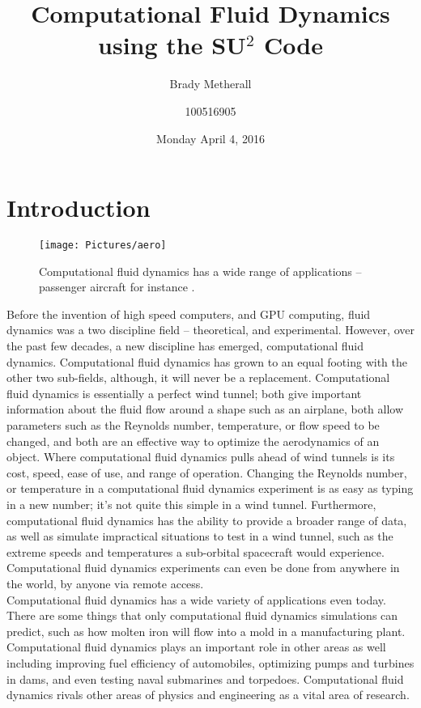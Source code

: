 \documentclass[10pt, titlepage]{article}
\title{Computational Fluid Dynamics \\ \large using the SU$^2$ Code}
\author{Brady Metherall \and 100516905}
\date{Monday April 4, 2016}
\makeatletter
\let\tohe@listfig\relax
\let\tohe@listtab\relax
\let\tohe@listoffigtab\listoffigtab
\def\listoffigtab{%
  \begingroup
  \def\tohe@listfig{Fig.~}
  \def\tohe@listtab{Tab.~}
  \tohe@listoffigtab
  \endgroup  
}
\makeatother
\begin{document}
\maketitle
\setlength\parindent{0pt}
\lstset{language=myMMA}

\listoffigtab

\section{Introduction}

\begin{wrapfigure}{R}{0.45\textwidth}
\centering
\texttt{[image: Pictures/aero]}
\caption[Example of Computational Fluid Dynamics Applications]{Computational fluid dynamics has a wide range of applications -- passenger aircraft for instance \cite{aeroplane}.}
\label{fig:aeroplane}
\end{wrapfigure}

Before the invention of high speed computers, and GPU computing, fluid dynamics was a two discipline field -- theoretical, and experimental. However, over the past few decades, a new discipline has emerged, computational fluid dynamics. Computational fluid dynamics has grown to an equal footing with the other two sub-fields, although, it will never be a replacement.  Computational fluid dynamics is essentially a perfect wind tunnel; both give important information about the fluid flow around a shape such as an airplane, both allow parameters such as the Reynolds number, temperature, or flow speed to be changed, and both are an effective way to optimize the aerodynamics of an object. Where computational fluid dynamics pulls ahead of wind tunnels is its cost, speed, ease of use, and range of operation. Changing the Reynolds number, or temperature in a computational fluid dynamics experiment is as easy as typing in a new number; it's not quite this simple in a wind tunnel. Furthermore, computational fluid dynamics has the ability to provide a broader range of data, as well as simulate impractical situations to test in a wind tunnel, such as the extreme speeds and temperatures a sub-orbital spacecraft would experience. Computational fluid dynamics experiments can even be done from anywhere in the world, by anyone via remote access. \\

Computational fluid dynamics has a wide variety of applications even today. There are some things that only computational fluid dynamics simulations can predict, such as how molten iron will flow into a mold in a manufacturing plant. Computational fluid dynamics plays an important role in other areas as well including improving fuel efficiency of automobiles, optimizing pumps and turbines in dams, and even testing naval submarines and torpedoes. Computational fluid dynamics rivals other areas of physics and engineering as a vital area of research. \\
\end{document}
